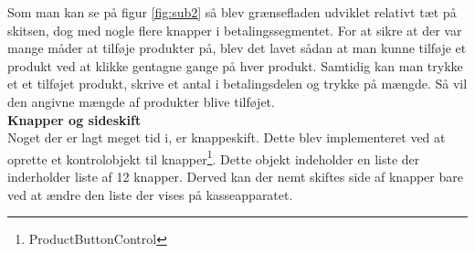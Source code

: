 Som man kan se på figur \ref*{fig:sub2} så blev grænsefladen udviklet relativt tæt på skitsen, dog med nogle flere knapper i betalingssegmentet. For at sikre at der var mange måder at tilføje produkter på, blev det lavet sådan at man kunne tilføje et produkt ved at klikke gentagne gange på hver produkt. Samtidig kan man trykke et et tilføjet produkt, skrive et antal i betalingsdelen og trykke på mængde. Så vil den angivne mængde af produkter blive tilføjet. \\

\textbf{Knapper og sideskift} \\
Noget der er lagt meget tid i, er knappeskift. Dette blev implementeret ved at oprette et kontrolobjekt til knapper\footnote{ProductButtonControl}. Dette objekt indeholder en liste der inderholder liste af 12 knapper. Derved kan der nemt skiftes side af knapper bare ved at ændre den liste der vises på kasseapparatet.